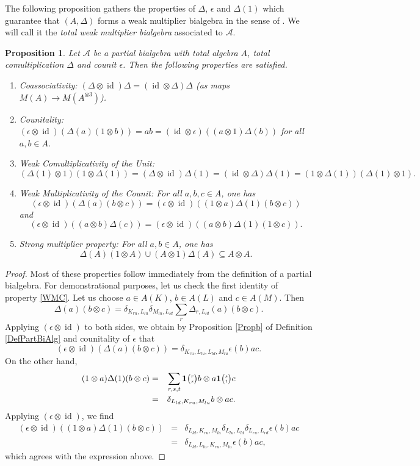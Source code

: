 \documentclass[10pt]{article}
\DeclareMathOperator{\id}{id}
\newcommand{\Grt}[3]{#1{\tiny{\begin{pmatrix} #2\\#3\end{pmatrix}}}}
\newcommand{\UnitC}[2]{\Grt{\mathbf{1}}{#1}{#2}}
\newtheorem{Prop}[Theorem]{Proposition}
\theoremstyle{definition}
\numberwithin{equation}{section}
\begin{document}
The following proposition gathers the properties of $\Delta$, $\epsilon$ and $\Delta(1)$ which guarantee that $(A,\Delta)$ forms a weak multiplier bialgebra in the sense of \cite[Definition 2.1]{Boh1}. We will call it the \emph{total weak multiplier bialgebra} associated to $\mathscr{A}$.

\begin{Prop} Let $\mathscr{A}$ be a partial bialgebra with total algebra $A$, total comultiplication $\Delta$ and counit $\epsilon$. Then the following properties are satisfied.
\begin{enumerate}[label={(\arabic*)}]
\item Coassociativity: $(\Delta\otimes \id)\Delta = (\id\otimes \Delta)\Delta$ (as maps $M(A)\rightarrow M(A^{\otimes 3})$).
\item Counitality: $(\epsilon\otimes \id)(\Delta(a)(1\otimes b)) = ab = (\id\otimes \epsilon)((a\otimes 1)\Delta(b))$ for all $a,b\in A$.
\item Weak Comultiplicativity of the Unit: \[(\Delta(1)\otimes 1)(1\otimes \Delta(1)) = (\Delta\otimes \id)\Delta(1) = (\id\otimes \Delta)\Delta(1) = (1\otimes \Delta(1))(\Delta(1)\otimes 1).\]
\item \label{WMC} Weak Multiplicativity of the Counit: For all $a,b,c\in A$, one has \[(\epsilon\otimes \id)(\Delta(a)(b\otimes c)) = (\epsilon\otimes \id)((1\otimes a)\Delta(1)(b\otimes c))\] and 
\[(\epsilon\otimes \id)((a\otimes b)\Delta(c)) = (\epsilon\otimes \id)((a\otimes b)\Delta(1)(1\otimes c)).\]
\item Strong multiplier property: For all $a,b\in A$, one has \[\Delta(A)(1\otimes A)\cup (A\otimes 1)\Delta(A)\subseteq  A\otimes A.\] 
\end{enumerate}
\end{Prop}

\begin{proof} Most of these properties follow immediately from the definition of a partial bialgebra. For demonstrational purposes, let us check the first identity of property \ref{WMC}. Let us choose $a\in A(K)$, $b\in A(L)$ and $c\in A(M)$. Then \[\Delta(a)(b\otimes c) = \delta_{K_{ru},L_{lu}}\delta_{M_{lu},L_{ld}} \sum_r \Delta_{r,L_{ld}}(a)(b\otimes c).\]  Applying $(\epsilon\otimes \id)$ to both sides, we obtain by Proposition \ref{Propb} of Definition \ref{DefPartBiAlg} and counitality of $\epsilon$ that \[(\epsilon \otimes \id)(\Delta(a)(b\otimes c)) = \delta_{K_{ru},L_{lu},L_{ld},M_{lu}} \epsilon(b) ac.\] On the other hand, \begin{eqnarray*} (1\otimes a)\Delta(1)(b\otimes c) &=& \sum_{r,s,t} \UnitC{r}{s} b \otimes a\UnitC{s}{t}c \\ &=& \delta_{L_{ld},K_{ru},M_{lu}} b \otimes ac.\end{eqnarray*} Applying $(\epsilon\otimes \id)$, we find \begin{eqnarray*} (\epsilon\otimes \id)( (1\otimes a)\Delta(1)(b\otimes c) ) &=&  \delta_{L_{ld},K_{ru},M_{lu}}\delta_{L_{lu},L_{ld}}\delta_{L_{ru},L_{rd}} \epsilon(b)ac \\ &=&  \delta_{L_{ld},L_{lu},K_{ru},M_{lu}} \epsilon(b)ac,\end{eqnarray*} which agrees with the expression above.
\end{proof} 
\end{document}
